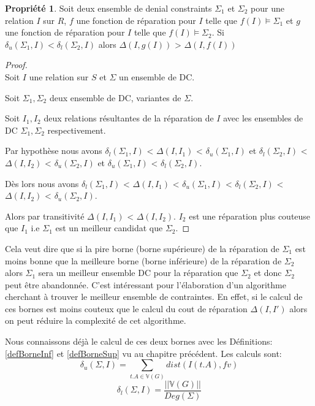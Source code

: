 \documentclass[letterpaper, 12pt]{report}
\theoremstyle{definition}
\newtheorem{myprop}{Propriété}
\newcommand{\V}{\mathbb{V}}
\begin{document}
\begin{myprop}
\label{boundRemove}
	Soit deux ensemble de denial constraints $\Sigma_1$ et $\Sigma_2$ pour une relation $I$ sur $R$, $f$ une fonction de réparation pour $I$ telle que $f(I)\models \Sigma_1$ et  $g$ une fonction de réparation pour $I$ telle que $f(I)\models \Sigma_2$. Si $\delta_u(\Sigma_1,I) < \delta_l(\Sigma_2,I)$ alors $\Delta(I,g(I))$ > $\Delta(I,f(I))$
\end{myprop}


\begin{proof}~\\
\hspace*{0.5cm} Soit $I$ une relation sur $S$ et $\Sigma$ un ensemble de DC.

Soit $\Sigma_1 , \Sigma_2$ deux ensemble de DC, variantes de $\Sigma$.

Soit $I_1 , I_2$ deux relations résultantes de la réparation de $I$ avec les ensembles de DC $\Sigma_1, \Sigma_2$ respectivement.

Par hypothèse nous avons $\delta_l(\Sigma_1,I)$ < $\Delta(I,I_1)$ < $\delta_u(\Sigma_1,I)$ et $\delta_l(\Sigma_2,I)$ < $\Delta(I,I_2)$ < $\delta_u(\Sigma_2,I)$ et $\delta_u(\Sigma_1,I)$ < $\delta_l(\Sigma_2,I)$.

Dès lors nous avons $\delta_l(\Sigma_1,I)$ < $\Delta(I,I_1)$ < $\delta_u(\Sigma_1,I)$ < $\delta_l(\Sigma_2,I)$ < $\Delta(I,I_2)$ < $\delta_u(\Sigma_2,I)$.

Alors par transitivité  $\Delta(I,I_1)$ < $\Delta(I,I_2)$. $I_2$ est une réparation plus couteuse que $I_1$ i.e $\Sigma_1$ est un meilleur candidat que $\Sigma_2$.
\end{proof}

Cela veut dire que si la pire borne (borne supérieure) de la réparation de $\Sigma_1$ est moins bonne que la meilleure borne (borne inférieure) de la réparation de $\Sigma_2$ alors $\Sigma_1$ sera un meilleur ensemble DC pour la réparation que $\Sigma_2$ et donc $\Sigma_2$ peut être abandonnée. C'est intéressant pour l'élaboration d'un algorithme cherchant à trouver le meilleur ensemble de contraintes. En effet, si le calcul de ces bornes est moins couteux que le calcul du cout de réparation $\Delta(I,I')$ alors on peut réduire la complexité de cet algorithme.

Nous connaissons déjà le calcul de ces deux bornes avec les Définitions: \ref{defBorneInf} et \ref{defBorneSup} vu au chapitre précédent. Les calculs sont:
$$\delta_u(\Sigma,I) = \sum_{t.A \in \mathbb{V}(G)} dist(I(t.A),fv)$$
$$\delta_l(\Sigma,I) = \frac{||\V(G)||}{Deg(\Sigma)} $$
\end{document}
